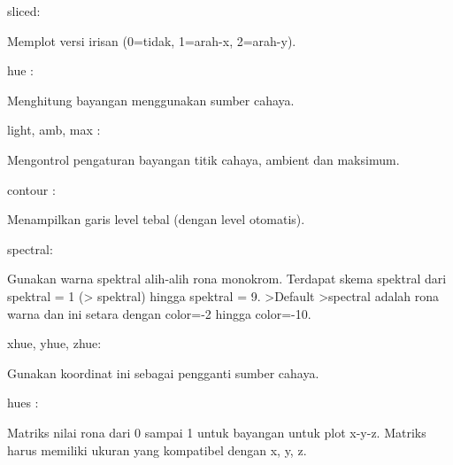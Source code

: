 \documentclass[a4paper,10pt]{article}
\begin{document}
\begin{eulernotebook}
\begin{eulercomment}
\begin{eulercomment}
\begin{eulercomment}
\begin{eulercomment}
\begin{eulercomment}
\begin{eulercomment}
\begin{eulercomment}
\begin{eulercomment}
\begin{eulercomment}
sliced:\\
\end{eulercomment}
\begin{eulerttcomment}
  Memplot versi irisan (0=tidak, 1=arah-x, 2=arah-y).
\end{eulerttcomment}
\begin{eulercomment}
hue :\\
\end{eulercomment}
\begin{eulerttcomment}
  Menghitung bayangan menggunakan sumber cahaya.
\end{eulerttcomment}
\begin{eulercomment}
light, amb, max :\\
\end{eulercomment}
\begin{eulerttcomment}
  Mengontrol pengaturan bayangan titik cahaya, ambient dan maksimum.
\end{eulerttcomment}
\begin{eulercomment}
contour  :\\
\end{eulercomment}
\begin{eulerttcomment}
  Menampilkan garis level tebal (dengan level otomatis).
\end{eulerttcomment}
\begin{eulercomment}
spectral:\\
\end{eulercomment}
\begin{eulerttcomment}
  Gunakan warna spektral alih-alih rona monokrom. Terdapat
  skema spektral dari spektral = 1 (> spektral) hingga spektral = 9.
  >Default >spectral adalah rona warna dan ini setara dengan
  color=-2 hingga color=-10.
\end{eulerttcomment}
\begin{eulercomment}
xhue, yhue, zhue:\\
\end{eulercomment}
\begin{eulerttcomment}
  Gunakan koordinat ini sebagai pengganti sumber cahaya.
\end{eulerttcomment}
\begin{eulercomment}
hues :\\
\end{eulercomment}
\begin{eulerttcomment}
  Matriks nilai rona dari 0 sampai 1 untuk bayangan untuk plot x-y-z.
  Matriks harus memiliki ukuran yang kompatibel dengan x, y, z.
\end{eulerttcomment}

\end{eulercomment}
\end{eulercomment}
\end{eulercomment}
\end{eulercomment}
\end{eulercomment}
\end{eulercomment}
\end{eulercomment}
\end{eulercomment}
\end{eulernotebook}
\end{document}
